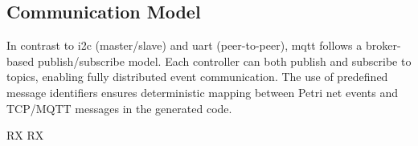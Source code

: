 \subsection{Communication Model}
In contrast to \gls{i2c} (master/slave) and \gls{uart} (peer-to-peer), \gls{mqtt} follows a broker-based publish/subscribe model. Each controller can both publish and subscribe to topics, enabling fully distributed event communication. The use of predefined message identifiers ensures deterministic mapping between Petri net events and TCP/MQTT messages in the generated code.

\gls{RX}
\gls{RX}









